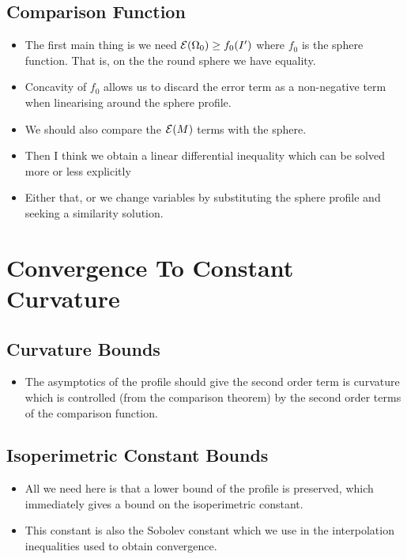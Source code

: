 \documentclass{amsart}
\begin{document}
\subsection{Comparison Function}

\begin{itemize}
\item The first main thing is we need \(\operatorname{\mathcal{E}}(\Omega_0) \geq f_0(I')\) where \(f_0\) is the sphere function. That is, on the the round sphere we have equality.
\item Concavity of \(f_0\) allows us to discard the error term as a non-negative term when linearising around the sphere profile.
\item We should also compare the \(\operatorname{\mathcal{E}}(M)\) terms with the sphere.
\item Then I think we obtain a linear differential inequality which can be solved more or less explicitly
\item Either that, or we change variables by substituting the sphere profile and seeking a similarity solution.
\end{itemize}

\section{Convergence To Constant Curvature}

\subsection{Curvature Bounds}

\begin{itemize}
\item The asymptotics of the profile should give the second order term is curvature which is controlled (from the comparison theorem) by the second order terms of the comparison function.
\end{itemize}

\subsection{Isoperimetric Constant Bounds}

\begin{itemize}
\item All we need here is that a lower bound of the profile is preserved, which immediately gives a bound on the isoperimetric constant.
\item This constant is also the Sobolev constant which we use in the interpolation inequalities used to obtain convergence.
\end{itemize}
\end{document}
